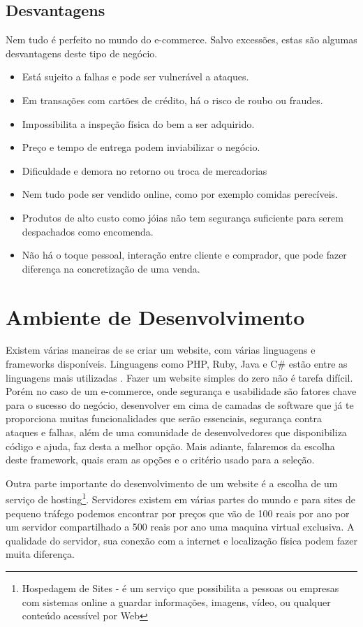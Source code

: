 \documentclass[
	12pt,				%
    oneside,			%
	a4paper,			%
	english,			%
	french,				%
	spanish,			%
	brazil				%
	]{abntex2}
\begin{document}
\subsection{Desvantagens}

Nem tudo é perfeito no mundo do e-commerce. Salvo excessões, estas são algumas desvantagens deste tipo de negócio.

\begin{itemize}
  \item Está sujeito a falhas e pode ser vulnerável a ataques.
  \item Em transações com cartões de crédito, há o risco de roubo ou fraudes.
  \item Impossibilita a inspeção física do bem a ser adquirido.
  \item Preço e tempo de entrega podem inviabilizar o negócio.
  \item Dificuldade e demora no retorno ou troca de mercadorias
  \item Nem tudo pode ser vendido online, como por exemplo comidas perecíveis.
  \item Produtos de alto custo como jóias não tem segurança suficiente para serem despachados como encomenda.
  \item Não há o toque pessoal, interação entre cliente e comprador, que pode fazer diferença na concretização de uma venda.
\end{itemize}


\section{Ambiente de Desenvolvimento}

Existem várias maneiras de se criar um website, com várias linguagens e frameworks disponíveis. Linguagens como PHP, Ruby, Java e C# estão entre as linguagens mais utilizadas \cite{UsageStatistics}. Fazer um website simples do zero não é tarefa difícil. Porém no caso de um e-commerce, onde segurança e usabilidade são fatores chave para o sucesso do negócio, desenvolver em cima de camadas de software que já te proporciona muitas funcionalidades que serão essenciais, segurança contra ataques e falhas, além de uma comunidade de desenvolvedores que disponibiliza código e ajuda, faz desta a melhor opção. Mais adiante, falaremos da escolha deste framework, quais eram as opções e o critério usado para a seleção.

Outra parte importante do desenvolvimento de um website é a escolha de um serviço de hosting\footnote{Hospedagem de Sites - é um serviço que possibilita a pessoas ou empresas com sistemas online a guardar informações, imagens, vídeo, ou qualquer conteúdo acessível por Web}. Servidores existem em várias partes do mundo e para sites de pequeno tráfego podemos encontrar por preços que vão de 100 reais por ano por um servidor compartilhado a 500 reais por ano uma maquina virtual exclusiva. A qualidade do servidor, sua conexão com a internet e localização física podem fazer muita diferença.
\end{document}
